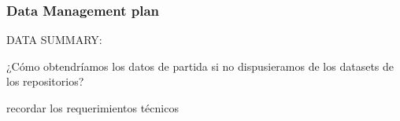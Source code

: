 \documentclass[12pt, spanish]{article}
\begin{document}
\subsubsection{Data Management plan}

DATA SUMMARY:

¿Cómo obtendríamos los datos de partida si no dispusieramos de los datasets de los repositorios?

recordar los requerimientos técnicos 































\end{document}
